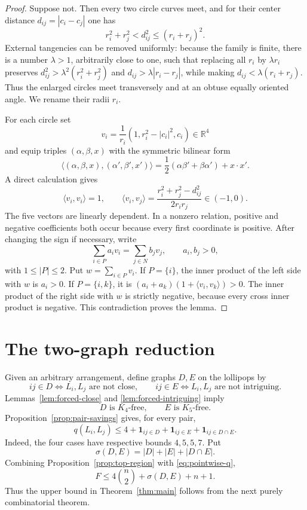 \documentclass[11pt]{article}
\theoremstyle{plain}
\theoremstyle{definition}
\theoremstyle{remark}
\newcommand{\R}{\mathbb R}
\newcommand{\1}{\mathbf 1}
\begin{document}
\begin{proof}
Suppose not.  Then every two circle curves meet, and for their center distance
$d_{ij}=|c_i-c_j|$ one has
\begin{equation}\label{eq:nonintr}
 r_i^2+r_j^2<d_{ij}^2\leq(r_i+r_j)^2.
\end{equation}
External tangencies can be removed uniformly: because the family is finite,
there is a number $\lambda>1$, arbitrarily close to one, such that replacing
all $r_i$ by $\lambda r_i$ preserves
$d_{ij}^2>\lambda^2(r_i^2+r_j^2)$ and
$d_{ij}>\lambda|r_i-r_j|$, while making
$d_{ij}<\lambda(r_i+r_j)$.  Thus the enlarged circles meet transversely and
at an obtuse equally oriented angle.  We rename their radii $r_i$.

For each circle set
\[
 v_i=\frac1{r_i}(1,r_i^2-|c_i|^2,c_i)\in\R^4
\]
and equip triples $(\alpha,\beta,x)$ with the symmetric bilinear form
\[
 \langle(\alpha,\beta,x),(\alpha',\beta',x')\rangle
 =\frac12(\alpha\beta'+\beta\alpha')+x\cdot x'.
\]
A direct calculation gives
\[
 \langle v_i,v_i\rangle=1,
 \qquad
 \langle v_i,v_j\rangle
 =\frac{r_i^2+r_j^2-d_{ij}^2}{2r_ir_j}\in(-1,0).
\]
The five vectors are linearly dependent.  In a nonzero relation, positive
and negative coefficients both occur because every first coordinate is
positive.  After changing the sign if necessary, write
\[
 \sum_{i\in P}a_i v_i=\sum_{j\in N}b_j v_j,
 \qquad a_i,b_j>0,
\]
with $1\leq|P|\leq2$.  Put $w=\sum_{i\in P}v_i$.  If $P=\{i\}$, the inner
product of the left side with $w$ is $a_i>0$.  If $P=\{i,k\}$, it is
$(a_i+a_k)(1+\langle v_i,v_k\rangle)>0$.  The inner product of the right side
with $w$ is strictly negative, because every cross inner product is negative.
This contradiction proves the lemma.
\end{proof}

\section{The two-graph reduction}\label{sec:reduction}

Given an arbitrary arrangement, define graphs $D,E$ on the lollipops by
\[
 ij\in D\iff L_i,L_j\text{ are not close},
 \qquad
 ij\in E\iff L_i,L_j\text{ are not intriguing}.
\]
Lemmas~\ref{lem:forced-close} and \ref{lem:forced-intriguing} imply
\begin{equation}\label{eq:forbidden}
 D\text{ is }K_4\text{-free},\qquad E\text{ is }K_5\text{-free}.
\end{equation}
Proposition~\ref{prop:pair-savings} gives, for every pair,
\begin{equation}\label{eq:pointwise-q}
 q(L_i,L_j)\leq
 4+\1_{ij\in D}+\1_{ij\in E}+\1_{ij\in D\cap E}.
\end{equation}
Indeed, the four cases have respective bounds $4,5,5,7$.  Put
\[
 \sigma(D,E)=|D|+|E|+|D\cap E|.
\]
Combining Proposition~\ref{prop:top-region} with \eqref{eq:pointwise-q},
\begin{equation}\label{eq:region-upper-reduction}
 F\leq4\binom n2+\sigma(D,E)+n+1.
\end{equation}
Thus the upper bound in Theorem~\ref{thm:main} follows from the next purely
combinatorial theorem.
\end{document}
